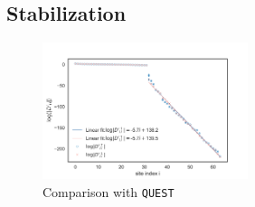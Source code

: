 \subsection{Stabilization}

\begin{figure}[H]
  \centering
  \includegraphics[width=6cm]{images/OrdersOfMagnitude_N=64sites.png}
  \caption{Comparison with \texttt{QUEST}}
  \label{fig:blade_flow_pressure}
\end{figure}



